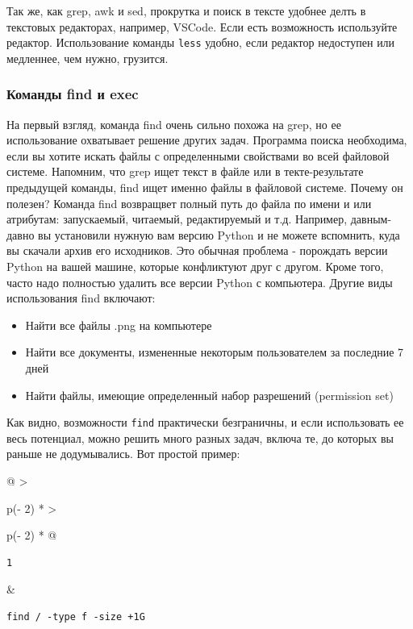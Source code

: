 \documentclass{report}
\begin{document}
Так же, как grep, awk и sed, прокрутка и поиск в тексте удобнее делть в
текстовых редакторах, например, VSCode. Если есть возможность
используйте редактор. Использование команды \texttt{less} удобно, если
редактор недоступен или медленнее, чем нужно, грузится.

\hypertarget{find-and-exec}{%
\subsubsection{\texorpdfstring{\protect\hyperlink{find-and-exec}{}Команды
find и exec}{Команды find и exec}}\label{find-and-exec}}

На первый взгляд, команда find очень сильно похожа на grep, но ее
использование охватывает решение других задач. Программа поиска
необходима, если вы хотите искать файлы с определенными свойствами во
всей файловой системе. Напомним, что grep ищет текст в файле или в
текте-результате предыдущей команды, find ищет именно файлы в файловой
системе. Почему он полезен? Команда find возвращвет полный путь до файла
по имени и или атрибутам: запускаемый, читаемый, редактируемый и т.д.
Например, давным-давно вы установили нужную вам версию Python и не
можете вспомнить, куда вы скачали архив его исходников. Это обычная
проблема - порождать версии Python на вашей машине, которые конфликтуют
друг с другом. Кроме того, часто надо полностью удалить все версии
Python с компьютера. Другие виды использования find включают:

\begin{itemize}
\tightlist
\item
  Найти все файлы .png на компьютере
\item
  Найти все документы, измененные некоторым пользователем за последние 7
  дней
\item
  Найти файлы, имеющие определенный набор разрешений (permission set)
\end{itemize}

Как видно, возможности \texttt{find} практически безграничны, и если
использовать ее весь потенциал, можно решить много разных задач, включа
те, до которых вы раньше не додумывались. Вот простой пример:

\begin{longtable}[]{@{}
  >{\raggedright\arraybackslash}p{(\columnwidth - 2\tabcolsep) * }
  >{\raggedright\arraybackslash}p{(\columnwidth - 2\tabcolsep) * }@{}}
\toprule
\endhead
\begin{minipage}[t]{\linewidth}\raggedright
\begin{verbatim}
1
\end{verbatim}
\end{minipage} & \begin{minipage}[t]{\linewidth}\raggedright
\begin{verbatim}
find / -type f -size +1G
\end{verbatim}
\end{minipage} \\ \addlinespace
\bottomrule
\end{longtable}
\end{document}
